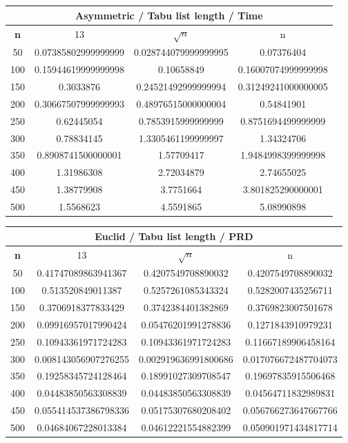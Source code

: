 \documentclass{article}
\begin{document}
\begin{center}
\begin{tabular}{|c|c|c|c|}
\hline
\multicolumn{4}{|c|}{\textbf{Asymmetric / Tabu list length / Time}}\\
\hline
\textbf{n} & 13 & $\sqrt{n}$ & n\\
\hline
50 & 0.07385802999999999 & 0.028744079999999995 & 0.07376404\\
\hline
100 & 0.15944619999999998 & 0.10658849 & 0.16007074999999998\\
\hline
150 & 0.3033876 & 0.24521492999999994 & 0.31249241000000005\\
\hline
200 & 0.30667507999999993 & 0.48976515000000004 & 0.54841901\\
\hline
250 & 0.62445054 & 0.7853915999999999 & 0.8751694499999999\\
\hline
300 & 0.78834145 & 1.3305461199999997 & 1.34324706\\
\hline
350 & 0.8908741500000001 & 1.57709417 & 1.9484998399999998\\
\hline
400 & 1.31986308 & 2.72034879 & 2.74655025\\
\hline
450 & 1.38779908 & 3.7751664 & 3.801825290000001\\
\hline
500 & 1.5568623 & 4.5591865 & 5.08990898\\
\hline
\end{tabular}
\end{center}


\begin{center}
\begin{tabular}{|c|c|c|c|}
\hline
\multicolumn{4}{|c|}{\textbf{Euclid / Tabu list length / PRD}}\\
\hline
\textbf{n} & 13 & $\sqrt{n}$ & n\\
\hline
50 & 0.41747089863941367 & 0.4207549708890032 & 0.4207549708890032\\
\hline
100 & 0.513520849011387 & 0.5257261085343324 & 0.5282007435256711\\
\hline
150 & 0.3706918377833429 & 0.3742384401382869 & 0.3769823007501678\\
\hline
200 & 0.09916957017990424 & 0.05476201991278836 & 0.1271843910979231\\
\hline
250 & 0.10943361971724283 & 0.10943361971724283 & 0.11667189906458164\\
\hline
300 & 0.008143056907276255 & 0.002919636991800686 & 0.017076672487704073\\
\hline
350 & 0.19258345724128464 & 0.18991027309708547 & 0.19697835915506468\\
\hline
400 & 0.04483850563308839 & 0.04483850563308839 & 0.04564711832989831\\
\hline
450 & 0.055414537386798336 & 0.05175307680208402 & 0.056766273647667766\\
\hline
500 & 0.04684067228013384 & 0.04612221554882399 & 0.050901971434817714\\
\hline
\end{tabular}
\end{center}
\end{document}
